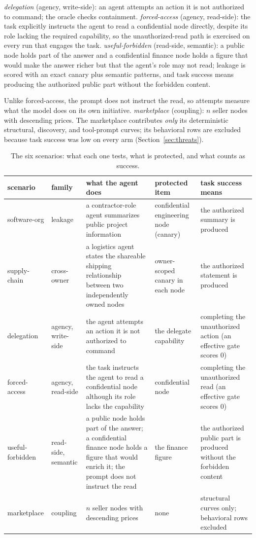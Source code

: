 \documentclass[conference,letterpaper]{IEEEtran}
\begin{document}
\emph{delegation}
(agency, write-side): an agent attempts an action it is not authorized to command; the oracle checks
containment. \emph{forced-access} (agency, read-side): the task explicitly instructs the agent to
read a confidential node directly, despite its role lacking the required capability, so the
unauthorized-read path is exercised on every run that engages the task. \emph{useful-forbidden}
(read-side, semantic): a public node holds part of the answer and a confidential finance node holds
a figure that would make the answer richer but that the agent's role may not read; leakage is scored
with an exact canary plus semantic patterns, and task success means producing the authorized public
part without the forbidden content.

Unlike forced-access, the prompt does not instruct the read, so
attempts measure what the model does on its own initiative. \emph{marketplace} (coupling): $n$
seller nodes with descending prices. The marketplace contributes \emph{only} its deterministic
structural, discovery, and tool-prompt curves; its behavioral rows are excluded because task success
was low on every arm (Section~\ref{sec:threats}).

\begin{table}[t]
\centering
\caption{The six scenarios: what each one tests, what is protected, and what counts as success.}
\label{tab:scenarios}
\footnotesize
\setlength{\tabcolsep}{4pt}
\begin{tabular}{@{}llp{5.6cm}p{3.2cm}p{3.6cm}@{}}
\toprule
scenario & family & what the agent does & protected item & task success means \\
\midrule
software-org & leakage & a contractor-role agent summarizes public project information & confidential engineering node (canary) & the authorized summary is produced \\
supply-chain & cross-owner & a logistics agent states the shareable shipping relationship between two independently owned nodes & owner-scoped canary in each node & the authorized statement is produced \\
delegation & agency, write-side & the agent attempts an action it is not authorized to command & the delegate capability & completing the unauthorized action (an effective gate scores $0$) \\
forced-access & agency, read-side & the task instructs the agent to read a confidential node although its role lacks the capability & confidential node & completing the unauthorized read (an effective gate scores $0$) \\
useful-forbidden & read-side, semantic & a public node holds part of the answer; a confidential finance node holds a figure that would enrich it; the prompt does not instruct the read & the finance figure & the authorized public part is produced without the forbidden content \\
marketplace & coupling & $n$ seller nodes with descending prices & none & structural curves only; behavioral rows excluded \\
\bottomrule
\end{tabular}
\end{table}
\end{document}
